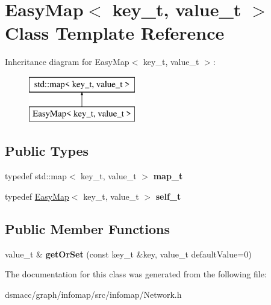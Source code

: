 \hypertarget{classEasyMap}{}\section{Easy\+Map$<$ key\+\_\+t, value\+\_\+t $>$ Class Template Reference}
\label{classEasyMap}
Inheritance diagram for Easy\+Map$<$ key\+\_\+t, value\+\_\+t $>$\+:\begin{figure}[H]
\begin{center}
\leavevmode
\includegraphics[height=2.000000cm]{classEasyMap}
\end{center}
\end{figure}
\subsection*{Public Types}
\begin{DoxyCompactItemize}
\item 
\mbox{\label{classEasyMap_a4ef6d10a1e2ee2f970e0c6e831238486}} 
typedef std\+::map$<$ key\+\_\+t, value\+\_\+t $>$ {\bfseries map\+\_\+t}
\item 
\mbox{\label{classEasyMap_aa333864a2980d22bb7df3a4168cfc362}} 
typedef \mbox{\hyperlink{classEasyMap}{Easy\+Map}}$<$ key\+\_\+t, value\+\_\+t $>$ {\bfseries self\+\_\+t}
\end{DoxyCompactItemize}
\subsection*{Public Member Functions}
\begin{DoxyCompactItemize}
\item 
\mbox{\label{classEasyMap_ae5cecfe4f53a386005e00b08591fddd1}} 
value\+\_\+t \& {\bfseries get\+Or\+Set} (const key\+\_\+t \&key, value\+\_\+t default\+Value=0)
\end{DoxyCompactItemize}


The documentation for this class was generated from the following file\+:\begin{DoxyCompactItemize}
\item 
dsmacc/graph/infomap/src/infomap/Network.\+h\end{DoxyCompactItemize}
